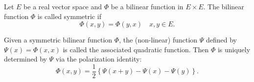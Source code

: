 Let $E$ be a real vector space and $\Phi$ be a bilinear function in $E \times E$. The bilinear function $\Phi$ is called symmetric if
$$\Phi(x, y) = \Phi(y, x) \quad x, y \in E.$$

Given a symmetric bilinear function $\Phi$, the (non-linear) function $\Psi$ defined by $\Psi(x) = \Phi(x, x)$ is called the associated quadratic function. Then $\Phi$ is uniquely determined by $\Psi$ via the polarization identity:
$$\Phi(x, y) = \frac{1}{2} \left\{ \Psi(x + y) - \Psi(x) - \Psi(y) \right\}.$$
